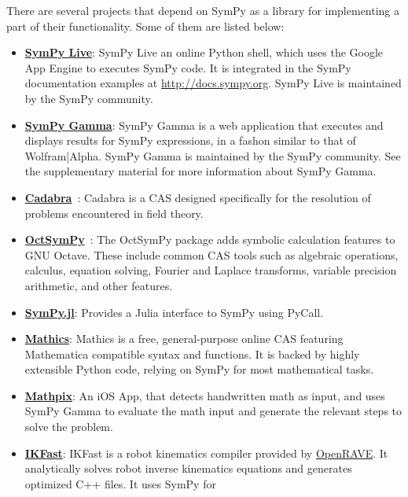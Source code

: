 There are several projects that depend on SymPy as a library for implementing
a part of their functionality. Some of them are listed below:

\begin{itemize}
\item \href{http://live.sympy.org/}{\textbf{SymPy Live}}: SymPy Live an online
  Python shell, which uses the Google App Engine to executes SymPy code. It is
  integrated in the SymPy documentation examples at
  \href{http://docs.sympy.org}{http://docs.sympy.org}. SymPy Live is
  maintained by the SymPy community.
\item \href{http://sympygamma.com/}{\textbf{SymPy Gamma}}: SymPy Gamma is a
  web application that executes and displays results for SymPy expressions, in
  a fashon similar to that of Wolfram|Alpha. SymPy Gamma is maintained by the
  SymPy community. See the supplementary material for more information about
  SymPy Gamma.
\item
  \href{http://cadabra.science/index.html}{\textbf{Cadabra}}~\cite{Peeters2007cadabra}:
  Cadabra is a CAS designed specifically for the resolution of problems
  encountered in field theory.
\item
  \href{https://github.com/cbm755/octsympy}{\textbf{OctSymPy}}~\cite{OctSymPy}:
  The OctSymPy package adds symbolic calculation features
  to GNU Octave. These include common CAS tools such
  as algebraic operations, calculus, equation solving, Fourier and
  Laplace transforms, variable precision arithmetic, and other features.
\item
  \href{https://github.com/jverzani/SymPy.jl}{\textbf{SymPy.jl}}:
  Provides a Julia interface to SymPy using PyCall.
\item
  \href{https://mathics.github.io/}{\textbf{Mathics}}: Mathics is a
  free, general-purpose online CAS featuring Mathematica compatible
  syntax and functions. It is backed by highly extensible Python code,
  relying on SymPy for most mathematical tasks.
\item
  \href{http://mathpix.com/}{\textbf{Mathpix}}: An iOS App, that detects handwritten math as input, and uses
  SymPy Gamma to evaluate the math input and generate the relevant
  steps to solve the problem.
\item
  \href{http://openrave.org/docs/0.8.2/openravepy/ikfast/}{\textbf{IKFast}}:
  IKFast is a robot kinematics compiler provided by
  \href{http://openrave.org/}{OpenRAVE}. It analytically solves robot inverse
  kinematics equations and generates optimized C++ files. It uses SymPy for

\end{itemize}
